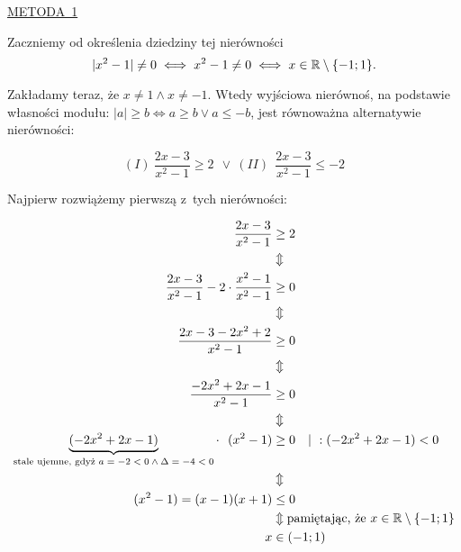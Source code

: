 \begin{rozw}
$ $

\underline{METODA~1}

Zaczniemy od określenia dziedziny tej nierówności
\[ |x^2-1| \neq 0 \iff x^2-1 \neq 0 \iff x\in \mathbb{R} \setminus \{-1;1\}. \]

Zakładamy teraz, że $x\neq 1 \wedge x \neq -1.$ Wtedy wyjściowa nierównoś, na podstawie własności modułu: $|a|\geq b \iff a\geq b \vee a\leq -b$, jest równoważna alternatywie nierówności: 

\[ (I) \ \frac{2x-3}{x^2-1} \geq 2 \ \ \vee \ (II) \ \ \frac{2x-3}{x^2-1} \leq -2 \]

Najpierw rozwiążemy pierwszą z~tych nierówności:

\begin{align*}
 \frac{2x-3}{x^2-1} &\geq 2 \\
 &\Updownarrow \\
 \frac{2x-3}{x^2-1} - 2\cdot \frac{x^2-1}{x^2-1} &\geq 0 \\
 &\Updownarrow \\
 \frac{2x-3-2x^2+2}{x^2-1} &\geq 0 \\
 &\Updownarrow \\
 \frac{-2x^2+2x-1}{x^2-1} &\geq 0 \\
 &\Updownarrow \\
 \underbrace{(-2x^2+2x-1)}_{\textrm{stale ujemne, gdyż $a=-2<0 \wedge \Delta=-4<0$}} \cdot \ \ (x^2-1) &\geq 0 \ \ \ | \ :(-2x^2+2x-1)<0 \\
 &\Updownarrow \\
 \ (x^2-1) = (x-1)(x+1)&\leq 0 \\
 &\Updownarrow \textrm{pamiętając, że $x \in \RR\setminus \{-1;1\}$} \\
 \ x &\in (-1;1)
\end{align*}


\end{rozw}
